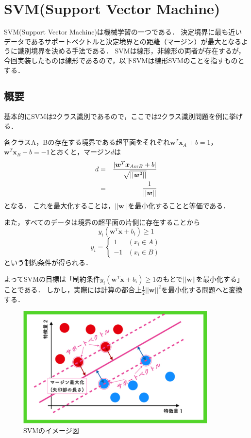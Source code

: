 \section*{SVM(Support Vector Machine)}
SVM(Support Vector Machine)は機械学習の一つである．
決定境界に最も近いデータであるサポートベクトルと決定境界との距離（マージン）が最大となるように識別境界を決める手法である．
SVMは線形，非線形の両者が存在するが，今回実装したものは線形であるので，以下SVMは線形SVMのことを指すものとする．

\subsection*{概要}
基本的にSVMは2クラス識別であるので，ここでは2クラス識別問題を例に挙げる．\par
各クラスA，Bの存在する境界である超平面をそれぞれ$\bm{w}^T\bm{x}_A+b=1$，$\bm{w}^T\bm{x}_B+b=-1$とおくと，マージン$d$は
\begin{eqnarray}
    d&=&\frac{|\bm{w}^T\bm{x}_{A{\rm or}B}+b|}{\sqrt{||\bm{w}^2||}}\\
    &=&\frac{1}{||\bm{w}||}
\end{eqnarray}
となる．
これを最大化することは，$||\bm{w}||$を最小化することと等価である．\par
また，すべてのデータは境界の超平面の片側に存在することから
\begin{equation}
    y_i(\bm{w}^T\bm{x}+b_i) \geq 1
\end{equation}
\[
    y_i=\begin{cases}
        1 & (x_i \in A)\\
        -1 & (x_i \in B)
    \end{cases}
\]
という制約条件が得られる．\par
よってSVMの目標は「制約条件$y_i(\bm{w}^T\bm{x}+b_i) \geq 1$のもとで$||\bm{w}||$を最小化する」ことである．
しかし，実際には計算の都合上$\frac{1}{2}||\bm{w}||^2$を最小化する問題へと変換する．
\begin{figure}[H]
    \begin{center}
        \includegraphics[width=100mm]{./figures/svm/svm.eps}
        \caption{SVMのイメージ図}
    \end{center}
\end{figure}

